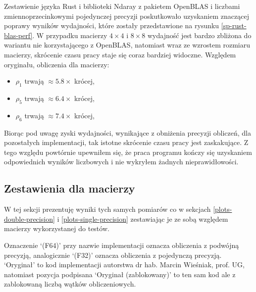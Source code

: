 \documentclass[11pt, a4paper]{article}
\begin{document}
\begin{sloppypar}
    Zestawienie języka Rust i biblioteki Ndaray z pakietem OpenBLAS i liczbami zmiennoprzecinkowymi
    pojedynczej precyzji poskutkowało uzyskaniem znaczącej poprawy wyników wydajności,
    które zostały przedstawione na rysunku \ref{sp-rust-blas-perf}. W przypadku macierzy
    $4\times4$ i $8\times8$ wydajność jest bardzo zbliżona do wariantu nie korzystającego
    z OpenBLAS, natomiast wraz ze wzrostem rozmiaru macierzy, skrócenie czasu pracy staje
    się coraz bardziej widoczne. Względem oryginału, obliczenia dla macierzy:
    \begin{itemize}
      \item $\rho_{1}$ trwają $\approx 5.8\times$ krócej,

      \item $\rho_{5}$ trwają $\approx 6.4\times$ krócej,

      \item $\rho_{6}$ trwają $\approx 7.4\times$ krócej,
    \end{itemize}
    Biorąc pod uwagę zyski wydajności, wynikające z obniżenia precyzji obliczeń, dla
    pozostałych implementacji, tak istotne skrócenie czasu pracy jest zaskakujące. Z
    tego względu powtórnie upewniłem się, że praca programu kończy się uzyskaniem odpowiednich
    wyników liczbowych i nie wykryłem żadnych nieprawidłowości.

    \FloatBarrier

    \subsection{Zestawienia dla macierzy}
    W tej sekcji prezentuję wyniki tych samych pomiarów co w sekcjach
    \ref{plots-double-precision} i \ref{plots-single-precision} zestawiając je ze sobą
    względem macierzy wykorzystanej do testów.

    Oznaczenie `(F64)' przy nazwie implementacji oznacza obliczenia z podwójną precyzją,
    analogicznie `(F32)' oznacza obliczenia z pojedynczą precyzją. `Oryginał' to kod
    implementacji autorstwa dr hab. Marcin Wieśniak, prof. UG, natomiast pozycja
    podpisana `Oryginał (zablokowany)' to ten sam kod ale z zablokowaną liczbą wątków
    obliczeniowych.


\end{sloppypar}
\end{document}
